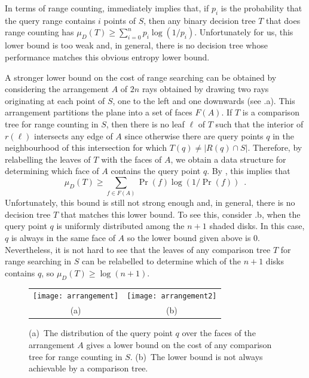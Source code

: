 \documentclass{patmorin}
\begin{document}
In terms of range counting,  immediately implies that,
if $p_i$ is the probability that the query range contains $i$ points
of $S$, then any binary decision tree $T$ that does range counting has
$\mu_D(T) \ge \sum_{i=0}^{n} p_i\log(1/p_i)$.  Unfortunately for us,
this lower bound is too weak and, in general, there is no decision
tree whose performance matches this obvious entropy lower bound.

A stronger lower bound on the cost of range searching can be obtained
by considering the arrangement $A$ of $2n$ rays obtained by drawing
two rays originating at each point of $S$, one to the left and one
downwards (see .a).  This arrangement partitions
the plane into a set of faces $F(A)$.  If $T$ is a comparison tree for
range counting in $S$, then there is no leaf $\ell$ of $T$ such that
the interior of $r(\ell)$ intersects any edge of $A$ since otherwise
there are query points $q$ in the neighbourhood of this intersection
for which $T(q)\neq |R(q)\cap S|$.  Therefore, by relabelling the leaves
of $T$ with the faces of $A$, we obtain a data structure for
determining which face of $A$ contains the query point $q$.
By , this implies that
\[
   \mu_D(T) \ge \sum_{f\in F(A)} \Pr(f)\log(1/\Pr(f)) \enspace .
\]
Unfortunately, this bound is still not strong enough and, in general,
there is no decision tree $T$ that matches this lower bound.  To see
this, consider .b, when the query point $q$ is
uniformly distributed among the $n+1$ shaded disks.  In this case,
$q$ is always in the same face of $A$ so the lower bound given above
is 0.  Nevertheless, it is not hard to see that the leaves of
any comparison tree $T$ for range searching in $S$ can be relabelled to
determine which of the $n+1$ disks contains $q$, so $\mu_D(T) \ge
\log(n+1)$.

\begin{figure}
  \begin{center}
    \begin{tabular}{cc}
      \texttt{[image: arrangement]} &
      \texttt{[image: arrangement2]} \\
        (a) & (b)
    \end{tabular}
  \end{center}
  \caption{(a)~The distribution of the query point $q$ over the faces
     of the arrangement $A$ gives a lower bound on the cost of any
     comparison tree for range counting in $S$. (b)~The lower bound is
     not always achievable by a comparison tree.}
\end{figure}
\end{document}
